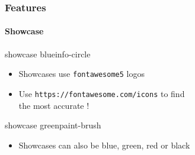 \documentclass{beamer}
\begin{document}
\begin{frame}[c]
    \frametitle{Features}
    \framesubtitle{Showcase}

    \begin{showcase}{showcase blue}{info-circle}
      \vspace{-2mm}
      \begin{itemize}
          \item Showcases use \texttt{fontawesome5} logos
          \item Use \texttt{https://fontawesome.com/icons} to find \\the most accurate !
      \end{itemize}
    \end{showcase}

    \begin{showcase}{showcase green}{paint-brush}
      \vspace{-2mm}
      \begin{itemize}
          \item Showcases can also be blue, green, red or black
      \end{itemize}
    \end{showcase}
\end{frame}
\end{document}
